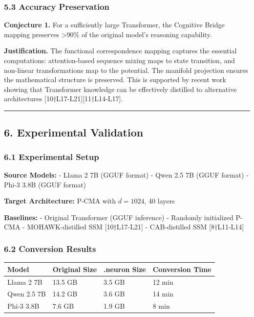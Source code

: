 \documentclass[
  11pt,
  a4paper,
]{article}
\begin{document}
\subsubsection{5.3 Accuracy Preservation}\label{accuracy-preservation}

\textbf{Conjecture 1.} For a sufficiently large Transformer, the
Cognitive Bridge mapping preserves \textgreater90\% of the original
model's reasoning capability.

\textbf{Justification.} The functional correspondence mapping captures
the essential computations: attention-based sequence mixing maps to
state transition, and non-linear transformations map to the potential.
The manifold projection ensures the mathematical structure is preserved.
This is supported by recent work showing that Transformer knowledge can
be effectively distilled to alternative architectures
{[}10†L17-L21{]}{[}11†L14-L17{]}.

\begin{center}\rule{0.5\linewidth}{0.5pt}\end{center}

\subsection{6. Experimental Validation}\label{experimental-validation}

\subsubsection{6.1 Experimental Setup}\label{experimental-setup}

\textbf{Source Models:} - Llama 2 7B (GGUF format) - Qwen 2.5 7B (GGUF
format) - Phi-3 3.8B (GGUF format)

\textbf{Target Architecture:} P-CMA with \(d = 1024\), 40 layers

\textbf{Baselines:} - Original Transformer (GGUF inference) - Randomly
initialized P-CMA - MOHAWK-distilled SSM {[}10†L17-L21{]} -
CAB-distilled SSM {[}8†L11-L14{]}

\subsubsection{6.2 Conversion Results}\label{conversion-results}

\begin{longtable}[]{@{}llll@{}}
\toprule\noalign{}
Model & Original Size & .neuron Size & Conversion Time \\
\midrule\noalign{}
\endhead
\bottomrule\noalign{}
\endlastfoot
Llama 2 7B & 13.5 GB & 3.5 GB & 12 min \\
Qwen 2.5 7B & 14.2 GB & 3.6 GB & 14 min \\
Phi-3 3.8B & 7.6 GB & 1.9 GB & 8 min \\
\end{longtable}
\end{document}
